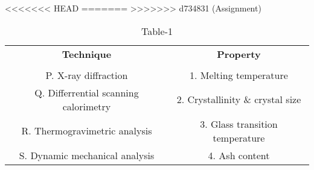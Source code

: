 \begin{table}[htbp]
  \centering
  \caption{Table-1}
<<<<<<< HEAD
  \label{tab:tables/table1.tex}
=======
  \label{table1}
>>>>>>> d734831 (Assignment)
  \begin{tabular}{cc}
  \textbf{Technique} & \textbf{Property} \\ \\
    P. X-ray diffraction & 1. Melting temperature \\
    Q. Differrential scanning calorimetry & 2. Crystallinity \& crystal size \\
    R. Thermogravimetric analysis & 3. Glass transition temperature \\
    S. Dynamic mechanical analysis & 4. Ash content \\
    
  \end{tabular}
\end{table}